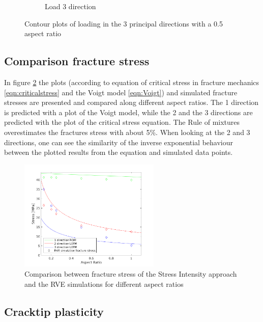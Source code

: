 \begin{figure}[H]
\begin{subfigure}[b]{0.8\textwidth}
    \caption{ Load 3 direction}
  \end{subfigure}
  \caption{Contour plots of loading in the 3 principal directions with a 0.5 aspect ratio}
  \label{fig:contour3}
\end{figure}

\subsection{Comparison fracture stress}
In figure \ref{fig:fracturestress} the plots (according to equation of critical stress in fracture mechanics \ref{eqn:criticalstress} and the Voigt model \ref{eqn:Voigt}) and simulated fracture stresses are presented and compared along different aspect ratios. The 1 direction is predicted with a plot of the Voigt model, while the 2 and the 3 directions are predicted with the plot of the critical stress equation. The Rule of mixtures overestimates the fractures stress with about 5\%. 
When looking at the 2 and 3 directions, one can see the similarity of the inverse exponential behaviour between the plotted results from the equation and simulated data points. 


\begin{figure}[H]
    \centering
    \includegraphics[width=0.60\textwidth]{chapter_7_non-elasticmodelling/figures/yieldstress.png}
    \caption{Comparison between fracture stress of the Stress Intensity approach and the RVE simulations for different aspect ratios}
    \label{fig:fracturestress}
\end{figure}
\subsection{Cracktip plasticity}

